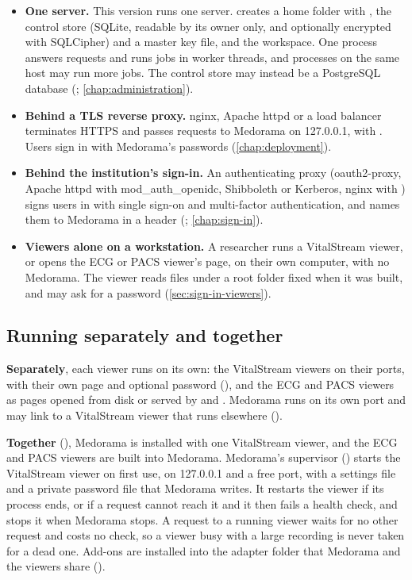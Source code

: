 \begin{itemize}
\item \textbf{One server.} This version runs one server. 
  creates a home folder with , the control store (SQLite, readable by its
  owner only, and optionally encrypted with SQLCipher) and a master key file, and the workspace.
  One  process answers requests and runs jobs in worker threads, and
   processes on the same host may run more jobs. The control store may instead
  be a PostgreSQL database (; \cref{chap:administration}).
\item \textbf{Behind a TLS reverse proxy.} nginx, Apache httpd or a load balancer terminates
  HTTPS and passes requests to Medorama on 127.0.0.1, with . Users
  sign in with Medorama's passwords (\cref{chap:deployment}).
\item \textbf{Behind the institution's sign-in.} An authenticating proxy (oauth2-proxy, Apache
  httpd with mod\_auth\_openidc, Shibboleth or Kerberos, nginx with ) signs
  users in with single sign-on and multi-factor authentication, and names them to Medorama in a
  header (; \cref{chap:sign-in}).
\item \textbf{Viewers alone on a workstation.} A researcher runs a VitalStream viewer, or opens
  the ECG or PACS viewer's page, on their own computer, with no Medorama. The
  viewer reads files under a root folder fixed when it was built, and may ask for a password
  (\cref{sec:sign-in-viewers}).
\end{itemize}

\subsection{Running separately and together}
\label{sec:architecture-together}

\textbf{Separately}, each viewer runs on its own: the VitalStream viewers on their ports, with
their own page and optional password (), and the ECG and
PACS viewers as pages opened from disk or served by  and .
Medorama runs on its own port and may link to a VitalStream viewer that runs elsewhere
().

\textbf{Together} (), Medorama is
installed with one VitalStream viewer, and the ECG and PACS viewers are built into Medorama.
Medorama's supervisor () starts the VitalStream viewer on first use, on
127.0.0.1 and a free port, with a settings file and a private password file that Medorama
writes. It restarts the viewer if its process ends, or if a request cannot reach it and it then
fails a health check, and stops it when Medorama stops. A request to a running viewer waits for
no other request and costs no check, so a viewer busy with a large recording is never taken for
a dead one. Add-ons are
installed into the adapter folder that Medorama and the viewers share
().

